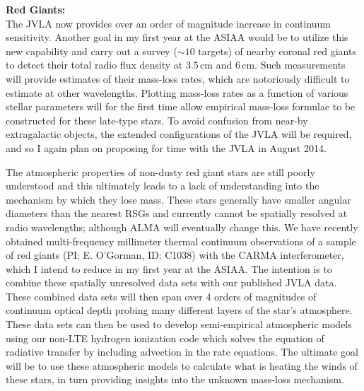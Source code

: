 \documentclass[11pt]{letter} %
\begin{document}
\textbf{Red Giants:}\\
The JVLA now provides over an order of magnitude increase in continuum sensitivity. Another goal in my first year at the ASIAA would be to utilize this new capability and carry out a survey ($\sim 10$ targets) of nearby coronal red giants to detect their total radio flux density at 3.5\,cm and 6\,cm. Such measurements will provide estimates of their mass-loss rates, which are notoriously difficult to estimate at other wavelengths. Plotting mass-loss rates as a function of various stellar parameters will for the first time allow empirical mass-loss formulae to be constructed for these late-type stars. To avoid confusion from near-by extragalactic objects, the extended configurations of the JVLA will be required, and so I again plan on proposing for time with the JVLA in August 2014.

The atmospheric properties of non-dusty red giant stars are still poorly understood and this ultimately leads to a lack of understanding into the mechanism by which they lose mass. These stars generally have smaller angular diameters than the nearest RSGs and currently cannot be spatially resolved at radio wavelengths; although ALMA will eventually change this. We have recently obtained multi-frequency millimeter thermal continuum observations of a sample of red giants (PI: E. O'Gorman, ID: C1038) with the CARMA interferometer, which I intend to reduce in my first year at the ASIAA. The intention is to combine these spatially unresolved data sets with our published JVLA data.  These combined data sets will then span over 4 orders of magnitudes of continuum optical depth probing many different layers of the star's atmosphere. These data sets can then be used to develop semi-empirical atmospheric models using our non-LTE hydrogen ionization code which solves the equation of radiative transfer by including advection in the rate equations. The ultimate goal will be to use these atmospheric models to calculate what is heating the winds of these stars, in turn providing insights into the unknown mass-loss mechanism. 
\end{document}
